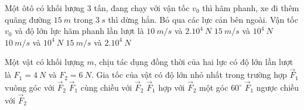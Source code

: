 \begin{ex}%
Một ôtô có khối lượng $3$ tấn, đang chạy với vận tốc $v_0$ thì hãm phanh, xe đi thêm quãng đường $15\ m$ trong $3\ s$ thì dừng hẳn. Bỏ qua các lực cản bên ngoài. Vận tốc $v_0$ và độ lớn lực hãm phanh lần lượt là
\choice
{$10\ m/s$ và $2.10^4\ N$}
{$15\ m/s$ và $10^4\ N$}
{\True $10\ m/s$ và $10^4\ N$}
{$15\ m/s$ và $2.10^4\ N$}
 \end{ex}

\begin{ex}%
Một vật có khối lượng $m$, chịu tác dụng đồng thời của hai lực có độ lớn lần lượt là $F_1=4\ N$ và $F_2=6\ N$. Gia tốc của vật có độ lớn nhỏ nhất trong trường hợp
\choice
{$\vec{F}_1$ vuông góc với $\vec{F}_2$}
{$\vec{F}_1$ cùng chiều với $\vec{F}_2$}
{$\vec{F}_1$ hợp với $\vec{F}_2$ một góc $60^{\circ}$}
{\True $\vec{F}_1$ ngược chiều với $\vec{F}_2$}
  \end{ex}
